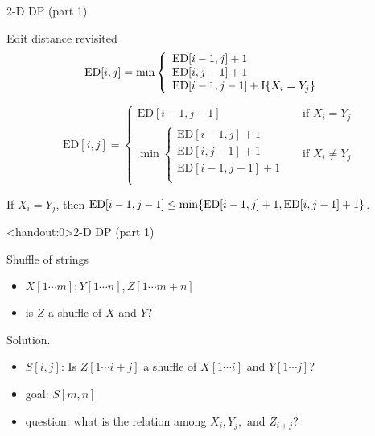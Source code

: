 \begin{frame}{2-D DP (part 1)}
  \begin{exampleblock}{Edit distance revisited}
    \begin{displaymath}
      \text{ED}[i,j] = \min \left\{ \begin{array}{ll}
	\text{ED}[i-1,j] + 1 &  \\
	\text{ED}[i,j-1] + 1 & \\
	\text{ED}[i-1,j-1] + \text{I}\{X_{i} = Y_{j}\} &
      \end{array} \right.
    \end{displaymath}
  \end{exampleblock}
    
  \begin{exampleblock}{}
    \begin{displaymath}
      \text{ED}[i,j] = \left\{ \begin{array}{ll}
        \text{ED}[i-1,j-1] & \text{if } X_{i} = Y_{j}  \\
        \min \left\{ \begin{array}{ll}
          \text{ED}[i-1,j] + 1 &  \\
          \text{ED}[i,j-1] + 1 &  \\
          \text{ED}[i-1,j-1] + 1 \\
	\end{array} \right. & \text{if } X_{i} \neq Y_{j}
      \end{array} \right.
    \end{displaymath}
  \end{exampleblock}

  \begin{theorem}
    If $X_{i} = Y_{j}$, then $\text{ED}[i-1,j-1] \le \min\{\text{ED}[i-1,j] + 1, \text{ED}[i,j-1] + 1\}$.
  \end{theorem}
\end{frame}
\begin{frame}<handout:0>{2-D DP (part 1)}
  \begin{exampleblock}{Shuffle of strings }
    \begin{itemize}
      \item $X[1 \cdots m]; Y[1 \cdots n], Z[1 \cdots m+n]$
      \item is $Z$ a shuffle of $X$ and $Y$?
    \end{itemize}
  \end{exampleblock}

  \begin{block}{Solution.}
    \begin{itemize}
      \item $S[i,j]$: Is $Z[1 \cdots i+j]$ a shuffle of $X[1 \cdots i]$ and $Y[1 \cdots j]$?
      \item goal: $S[m,n]$
      \item question: what is the relation among $X_{i}, Y_{j}, \text{ and } Z_{i+j}$?
    \end{itemize}
  \end{block}
\end{frame}
